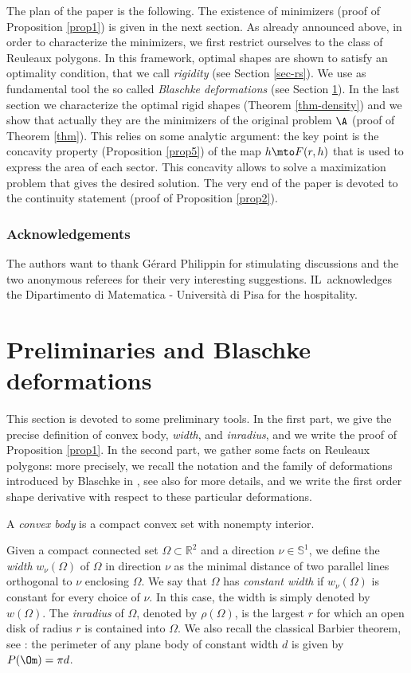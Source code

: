 The plan of the paper is the following. The existence of minimizers (proof of Proposition \ref{prop1}) is given in the next section. As already announced above, in order to characterize the minimizers, we first restrict ourselves to the class of Reuleaux polygons. In this framework, optimal shapes are shown to satisfy an optimality condition, that we call \emph{rigidity} (see Section \ref{sec-rs}). We use as fundamental tool the so called \emph{Blaschke deformations} (see Section \ref{sec-prel}). In the last section we characterize the optimal rigid shapes (Theorem \ref{thm-density}) and we show that actually they are the minimizers of the original problem $\A$ (proof of Theorem \ref{thm}). {This relies on some analytic argument: the key
point is the concavity property (Proposition \ref{prop5})
of the map $h\mto F(r,h)$ that is used to express the area of
each sector. This concavity allows to solve a maximization problem that gives the desired solution.}
The very end of the paper is devoted to the continuity statement (proof of Proposition \ref{prop2}).

\subsubsection*{Acknowledgements}
The authors want to thank Gérard Philippin for stimulating discussions and the two anonymous referees for their very interesting suggestions. IL~acknowledges the Dipartimento di Matematica - Università di Pisa for the hospitality.

\section{Preliminaries and Blaschke deformations}\label{sec-prel}
This section is devoted to some preliminary tools. In the first part, we give the precise definition of {convex body}, \emph{width}, and \emph{inradius}, and we write the proof of Proposition \ref{prop1}. In the second part, we gather some facts on Reuleaux polygons: more precisely, we recall the notation and the family of deformations introduced by Blaschke in \cite{Bla},
see also \cite{KM} for more details, and we write the first order shape derivative with respect to these particular deformations.
{\begin{definition}
A \emph{convex body} is a compact convex set with nonempty interior.
\end{definition}}
\begin{definition}
Given a {compact connected} set $\Omega\subset \mathbb R^2$ and a direction $\nu \in \mathbb S^1$, we define the \emph{width} $w_\nu(\Omega)$ of $\Omega$ in direction $\nu$ as the minimal distance of two parallel lines orthogonal to $\nu$ enclosing $\Omega$. We say that $\Omega$ has \emph{constant width} if $w_\nu(\Omega)$ is constant for every choice of $\nu$. In this case, the width is simply denoted by $w(\Omega)$.
The \emph{inradius} of $\Omega$, denoted by $\rho(\Omega)$, is the largest $r$ for which an open disk of radius $r$ is contained into $\Omega$. We also recall the classical Barbier theorem, see
\cite{CG}: the perimeter of any plane body of constant width $d$ is given by $P(\Om)=\pi d$.
\end{definition}

